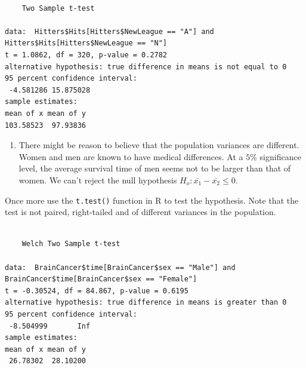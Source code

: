 \documentclass[
  letterpaper,
  DIV=11,
  numbers=noendperiod]{scrreprt}
\newenvironment{Shaded}{\begin{snugshade}}{\end{snugshade}}
\newcommand{\AttributeTok}[1]{\textcolor[rgb]{0.40,0.45,0.13}{#1}}
\newcommand{\DecValTok}[1]{\textcolor[rgb]{0.68,0.00,0.00}{#1}}
\newcommand{\FloatTok}[1]{\textcolor[rgb]{0.68,0.00,0.00}{#1}}
\newcommand{\FunctionTok}[1]{\textcolor[rgb]{0.28,0.35,0.67}{#1}}
\newcommand{\NormalTok}[1]{\textcolor[rgb]{0.00,0.23,0.31}{#1}}
\newcommand{\SpecialCharTok}[1]{\textcolor[rgb]{0.37,0.37,0.37}{#1}}
\newcommand{\StringTok}[1]{\textcolor[rgb]{0.13,0.47,0.30}{#1}}
\providecommand{\tightlist}{%
  \setlength{\itemsep}{0pt}\setlength{\parskip}{0pt}}\usepackage{longtable,booktabs,array}
\begin{document}
\begin{verbatim}

    Two Sample t-test

data:  Hitters$Hits[Hitters$NewLeague == "A"] and Hitters$Hits[Hitters$NewLeague == "N"]
t = 1.0862, df = 320, p-value = 0.2782
alternative hypothesis: true difference in means is not equal to 0
95 percent confidence interval:
 -4.581286 15.875028
sample estimates:
mean of x mean of y 
103.58523  97.93836 
\end{verbatim}

\begin{blackbox}

\begin{enumerate}
\def\labelenumi{\arabic{enumi}.}
\setcounter{enumi}{1}
\tightlist
\item
  There might be reason to believe that the population variances are
  different. Women and men are known to have medical differences. At a
  \(5\)\% significance level, the average survival time of men seems not
  to be larger than that of women. We can't reject the null hypothesis
  \(H_{o}:\bar {x_{1}}-\bar {x_{2}} \leq 0\).
\end{enumerate}

\end{blackbox}

Once more use the \texttt{t.test()} function in R to test the
hypothesis. Note that the test is not paired, right-tailed and of
different variances in the population.

\begin{Shaded}
\end{Shaded}

\begin{verbatim}

    Welch Two Sample t-test

data:  BrainCancer$time[BrainCancer$sex == "Male"] and BrainCancer$time[BrainCancer$sex == "Female"]
t = -0.30524, df = 84.867, p-value = 0.6195
alternative hypothesis: true difference in means is greater than 0
95 percent confidence interval:
 -8.504999       Inf
sample estimates:
mean of x mean of y 
 26.78302  28.10200 
\end{verbatim}
\end{document}
